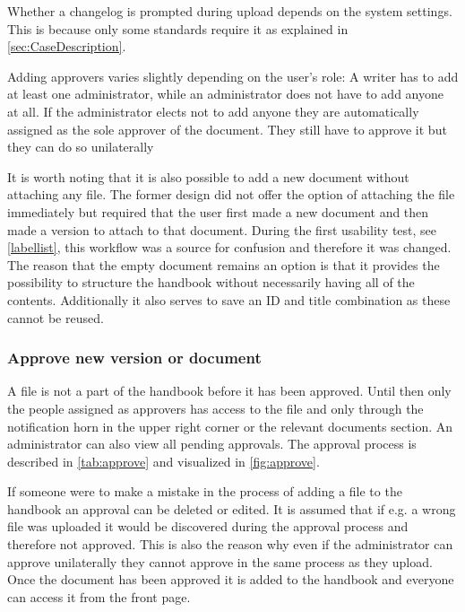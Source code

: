 


Whether a changelog is prompted during upload depends on the system settings.
This is because only some standards require it as explained in \cref{sec:CaseDescription}.

Adding approvers varies slightly depending on the user's role:
A writer has to add at least one administrator, while an administrator does not have to add anyone at all.
If the administrator elects not to add anyone they are automatically assigned as the sole approver of the document.
They still have to approve it but they can do so unilaterally

It is worth noting that it is also possible to add a new document without attaching any file.
The former design did not offer the option of attaching the file immediately but required that the user first made a new document and then made a version to attach to that document.
During the first usability test, see \cref{labellist}, this workflow was a source for confusion and therefore it was changed.
The reason that the empty document remains an option is that it provides the possibility to structure the handbook without necessarily having all of the contents.
Additionally it also serves to save an ID and title combination as these cannot be reused. 

\subsubsection{Approve new version or document}
A file is not a part of the handbook before it has been approved.
Until then only the people assigned as approvers has access to the file and only through the notification horn in the upper right corner or the relevant documents section.
An administrator can also view all pending approvals.
The approval process is described in \cref{tab:approve} and visualized in \cref{fig:approve}.


%

If someone were to make a mistake in the process of adding a file to the handbook an approval can be deleted or edited.
It is assumed that if e.g. a wrong file was uploaded it would be discovered during the approval process and therefore not approved.
This is also the reason why even if the administrator can approve unilaterally they cannot approve in the same process as they upload.
Once the document has been approved it is added to the handbook and everyone can access it from the front page.

